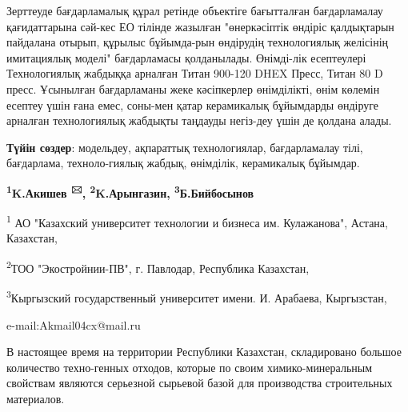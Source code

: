 Зерттеуде бағдарламалық құрал ретінде объектіге бағытталған
бағдарламалау қағидаттарына сәй-кес ЕО тілінде жазылған "өнеркәсіптік
өндіріс қалдықтарын пайдалана отырып, құрылыс бұйымда-рын өндірудің
технологиялық желісінің имитациялық моделі" бағдарламасы қолданылады.
Өнімді-лік есептеулері Технологиялық жабдыққа арналған Титан 900-120 DHEX
Пресс, Титан 80 D пресс. Ұсынылған бағдарламаны жеке кәсіпкерлер
өнімділікті, өнім көлемін есептеу үшін ғана емес, соны-мен қатар
керамикалық бұйымдарды өндіруге арналған технологиялық жабдықты таңдауды
негіз-деу үшін де қолдана алады.

{\bfseries Түйін сөздер}: модельдеу, ақпараттық технологиялар,
бағдарламалау тілі, бағдарлама, техноло-гиялық жабдық, өнімділік,
керамикалық бұйымдар.


\begin{center}
{\bfseries \textsuperscript{1}K.Акишев \textsuperscript{🖂},
\textsuperscript{2}K.Арынгазин, \textsuperscript{3}Б.Бийбосынов}

\textsuperscript{1} АО "Казахский университет технологии и бизнеса им.
Кулажанова", Астана, Казахстан,

\textsuperscript{2}ТОО "Экостройнии-ПВ", г. Павлодар, Республика
Казахстан,

\textsuperscript{3}Кыргызский государственный университет имени. И.
Арабаева, Кыргызстан,

e-mail:Akmail04cx@mail.ru
\end{center}

В настоящее время на территории Республики Казахстан, складировано
большое количество техно-генных отходов, которые по своим
химико-минеральным свойствам являются серьезной сырьевой базой для
производства строительных материалов.

